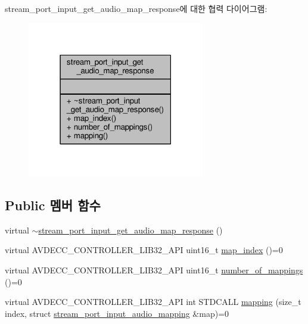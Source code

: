 stream\+\_\+port\+\_\+input\+\_\+get\+\_\+audio\+\_\+map\+\_\+response에 대한 협력 다이어그램\+:
\nopagebreak
\begin{figure}[H]
\begin{center}
\leavevmode
\includegraphics[width=219pt]{classavdecc__lib_1_1stream__port__input__get__audio__map__response__coll__graph}
\end{center}
\end{figure}
\subsection*{Public 멤버 함수}
\begin{DoxyCompactItemize}
\item 
virtual \hyperlink{classavdecc__lib_1_1stream__port__input__get__audio__map__response_a4cb3e65d0f5f4ae5e9f7059644d073bc}{$\sim$stream\+\_\+port\+\_\+input\+\_\+get\+\_\+audio\+\_\+map\+\_\+response} ()
\item 
virtual A\+V\+D\+E\+C\+C\+\_\+\+C\+O\+N\+T\+R\+O\+L\+L\+E\+R\+\_\+\+L\+I\+B32\+\_\+\+A\+PI uint16\+\_\+t \hyperlink{classavdecc__lib_1_1stream__port__input__get__audio__map__response_a95b259013c01868261bbe7e7d5768b59}{map\+\_\+index} ()=0
\item 
virtual A\+V\+D\+E\+C\+C\+\_\+\+C\+O\+N\+T\+R\+O\+L\+L\+E\+R\+\_\+\+L\+I\+B32\+\_\+\+A\+PI uint16\+\_\+t \hyperlink{classavdecc__lib_1_1stream__port__input__get__audio__map__response_a7f2372b5389cf9ba04675f3ef37439f3}{number\+\_\+of\+\_\+mappings} ()=0
\item 
virtual A\+V\+D\+E\+C\+C\+\_\+\+C\+O\+N\+T\+R\+O\+L\+L\+E\+R\+\_\+\+L\+I\+B32\+\_\+\+A\+PI int S\+T\+D\+C\+A\+LL \hyperlink{classavdecc__lib_1_1stream__port__input__get__audio__map__response_af3baf3e496f1553669459edbbf5b3fc0}{mapping} (size\+\_\+t index, struct \hyperlink{structavdecc__lib_1_1stream__port__input__audio__mapping}{stream\+\_\+port\+\_\+input\+\_\+audio\+\_\+mapping} \&map)=0
\end{DoxyCompactItemize}


